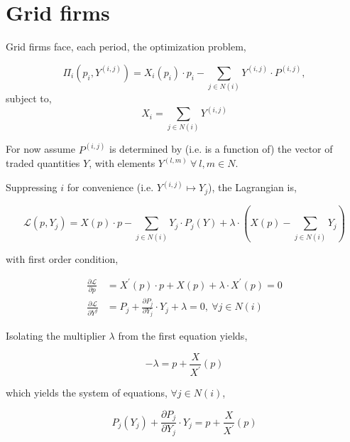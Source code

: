 \documentclass[american]{scrartcl}
\begin{document}
\section{Grid firms}

Grid firms face, each period, the optimization problem,

\begin{equation}
	\Pi_i\left(p_i, Y^{(i, j)}\right) = X_i(p_i) \cdot p_i - \sum_{j \in N(i)} Y^{(i, j)} \cdot P^{(i, j)},
\end{equation}
subject to,
\begin{equation}
	X_i=  \sum_{j \in N(i)} Y^{(i, j)}
\end{equation}

For now assume $P^{(i, j)}$ is determined by (i.e. is a function of) the vector of traded quantities $Y$, with elements $Y^{(l, m)} \ \forall \ l, m \in N$.

Suppressing $i$ for convenience (i.e. $Y^{(i, j)} \mapsto Y_j$), the Lagrangian is,

\begin{equation}
	\mathcal{L}\left(p, Y_j\right) = X(p) \cdot p - \sum_{j \in N(i)} Y_j \cdot P_j (Y) + \lambda\cdot \left(X(p) - \sum_{j \in N(i)} Y_j\right)
\end{equation}

with first order condition,

\begin{equation}
	\begin{split}
		\frac{\partial \mathcal{L}}{\partial p}  &= X^\prime(p) \cdot p + X(p) + \lambda \cdot X^\prime(p) = 0 \\
		\frac{\partial \mathcal{L}}{\partial Y^j}  &= P_j + \frac{\partial P_j}{\partial Y_j} \cdot Y_j + \lambda =0, \ \forall j \in N(i)
	\end{split}
\end{equation}

Isolating the multiplier $\lambda$ from the first equation yields,

\begin{equation}
	- \lambda = p + \frac{X}{X^\prime}(p)
\end{equation}

which yields the system of equations, $\forall j \in N(i)$,

\begin{equation} \label{firm_optimization}
	P_j(Y_j) + \frac{\partial P_j}{\partial Y_j} \cdot Y_j = p + \frac{X}{X^\prime}(p)
\end{equation}
\end{document}
